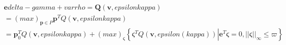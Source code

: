 \begin{align}
  & \mathbf{e} \mathit{delta} - \mathit{gamma} + \mathit{varrho} = \mathbf{Q} \left(\mathbf{v} , \mathit{epsilon} \mathit{kappa}\right) \tag{eq\_0057} \\
  & = \left(m a x\right)_{\mathbf{p} \in P} \mathbf{p}^{T} Q \left(\mathbf{v} , \mathit{epsilon} \mathit{kappa}\right) \tag{eq\_0059} \\
  & = \mathbf{p}_{0}^{T} Q \left(\mathbf{v} , \mathit{epsilon} \mathit{kappa}\right) + \left(m a x\right)_{ϛ} \left\{\right. ϛ^{T} Q \left(\mathbf{v} , \mathit{epsilon} \left(\mathit{kappa}\right)\right) \left|\right. \mathbf{e}^{T} ϛ = 0 , \left|\left|ϛ\right|\right|_{\infty} \leq ϖ \left.\right\} \tag{eq\_0060} \\
\end{align}
